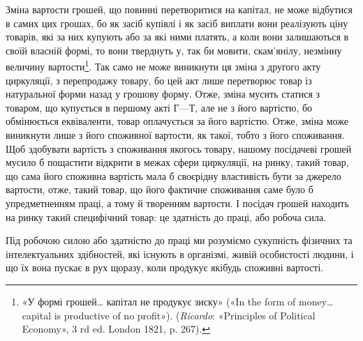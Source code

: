 Зміна вартости грошей, що повинні перетворитися на капітал,
не може відбутися в самих цих грошах, бо як засіб купівлі і як
засіб виплати вони реалізують ціну товарів, які за них купують
або за які ними платять, а коли вони залишаються в своїй власній
формі, то вони тверднуть у, так би мовити, скам’янілу, незмінну
величину вартости\footnote{
«У формі грошей\dots{} капітал не продукує зиску» («In the form of
money\dots{} capital is productive of no profit»). (\emph{Ricardo}: «Principles
of Political Economy», 3 rd ed. London 1821, p. 267).
}. Так само не може виникнути ця зміна з
другого акту циркуляції, з перепродажу товару, бо цей акт лише
перетворює товар із натуральної форми назад у грошову форму.
Отже, зміна мусить статися з товаром, що купується в першому
акті $Г — Т$, але не з його вартістю, бо обмінюється еквіваленти,
товар оплачується за його вартістю. Отже, зміна може виникнути
лише з його споживної вартости, як такої, тобто з його споживання.
Щоб здобувати вартість з споживання якогось товару, нашому
посідачеві грошей мусило б пощастити відкрити в межах сфери
циркуляції, на ринку, такий товар, що сама його споживна вартість
мала б своєрідну властивість бути за джерело вартости,
отже, такий товар, що його фактичне споживання саме було б
упредметненням праці, а тому й творенням вартости. І посідач
грошей находить на ринку такий специфічний товар: це здатність
до праці, або робоча сила.

Під робочою силою або здатністю до праці ми розуміємо
сукупність фізичних та інтелектуальних здібностей, які існують
в організмі, живій особистості людини, і що їх вона пускає в рух
щоразу, коли продукує якібудь споживні вартості.
\parbreak{}

